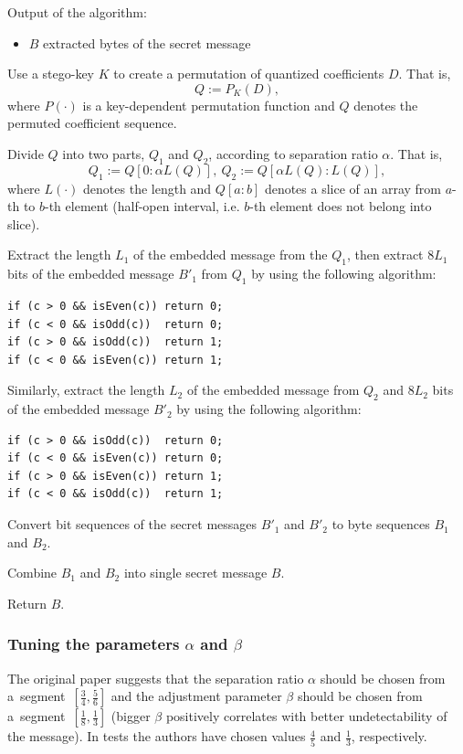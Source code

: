 Output of the algorithm:

\begin{itemize}
    \item $B$ extracted bytes of the secret message
\end{itemize}

\begin{Algo}
\item 
Use a stego-key $K$ to create a permutation of quantized coefficients $D$.
That is, $$Q := P_K(D),$$ where $P(\cdot)$ is a key-dependent
permutation function and $Q$ denotes the permuted coefficient sequence.
\item
Divide $Q$ into two parts, $Q_1$ and $Q_2$, according to separation ratio $\alpha$.
That is, $$Q_1 := Q[0 : \alpha L(Q)],~ Q_2 := Q[\alpha L(Q) : L(Q)],$$
where $L(\cdot)$ denotes the length and $Q[a : b]$ denotes a slice of an array from 
$a$-th to $b$-th element (half-open interval, i.e. $b$-th element does not belong into slice).
\item
Extract the length $L_1$ of the embedded message from the $Q_1$, then extract $8 L_1$ bits of
the embedded message $B'_1$ from $Q_1$ by using the following algorithm:
\begin{lstlisting}
if (c > 0 && isEven(c)) return 0;
if (c < 0 && isOdd(c))  return 0;
if (c > 0 && isOdd(c))  return 1;
if (c < 0 && isEven(c)) return 1;
\end{lstlisting}
\item
Similarly, extract the length $L_2$ of the embedded message from $Q_2$ and $8 L_2$ bits of the 
embedded message $B'_2$ by using the following algorithm:
\begin{lstlisting}
if (c > 0 && isOdd(c))  return 0;
if (c < 0 && isEven(c)) return 0;
if (c > 0 && isEven(c)) return 1;
if (c < 0 && isOdd(c))  return 1;
\end{lstlisting}
\item
Convert bit sequences of the secret messages $B'_1$ and $B'_2$ to byte sequences $B_1$ and $B_2$.
\item
Combine $B_1$ and $B_2$ into single secret message $B$.
\item 
Return $B$.

\end{Algo}

\subsubsection{Tuning the parameters $\alpha$ and $\beta$}
The original paper suggests that the separation ratio $\alpha$
should be chosen from a~segment~$\left[ \frac{3}{4}, \frac{5}{6} \right]$
and the adjustment parameter $\beta$ should be chosen from a~segment~$\left[\frac{1}{8}, \frac{1}{3}\right]$ 
(bigger $\beta$ positively correlates with
better undetectability of the message). 
In tests the authors have chosen
values $\frac{4}{5}$ and $\frac{1}{3}$, respectively.


